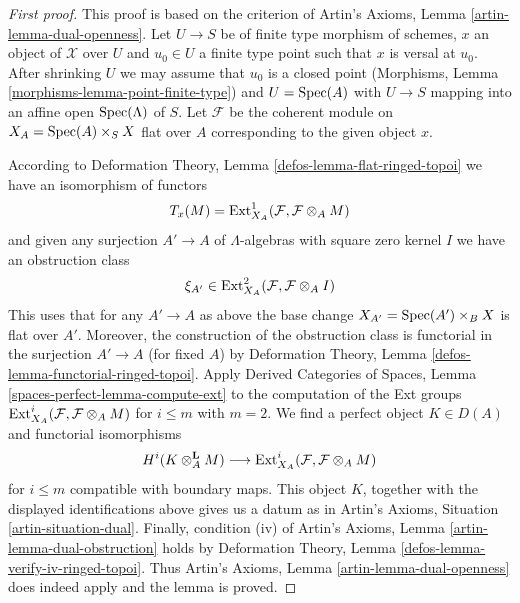 \begin{proof}[First proof]
This proof is based on the criterion of
Artin's Axioms, Lemma \ref{artin-lemma-dual-openness}.
Let $U \to S$ be of finite type morphism of schemes, $x$ an object of
$\mathcal{X}$ over $U$ and $u_0 \in U$ a finite type point such that
$x$ is versal at $u_0$. After shrinking $U$ we may assume that $u_0$
is a closed point (Morphisms, Lemma \ref{morphisms-lemma-point-finite-type})
and $U = \mathop{\mathrm{Spec}}(A)$ with $U \to S$ mapping into an
affine open $\mathop{\mathrm{Spec}}(\Lambda)$ of $S$.
Let $\mathcal{F}$ be the coherent module on $X_A = \mathop{\mathrm{Spec}}(A) \times_S X$
flat over $A$ corresponding to the given object $x$.

\medskip\noindent
According to Deformation Theory, Lemma \ref{defos-lemma-flat-ringed-topoi}
we have an isomorphism of functors
$$
T_x(M) = \mathop{\mathrm{Ext}}\nolimits^1_{X_A}(\mathcal{F}, \mathcal{F} \otimes_A M)
$$
and given any surjection $A' \to A$ of $\Lambda$-algebras with square zero
kernel $I$ we have an obstruction class
$$
\xi_{A'} \in \mathop{\mathrm{Ext}}\nolimits^2_{X_A}(\mathcal{F}, \mathcal{F} \otimes_A I)
$$
This uses that for any $A' \to A$ as above the base change
$X_{A'} = \mathop{\mathrm{Spec}}(A') \times_B X$ is flat over $A'$.
Moreover, the construction of the obstruction class is functorial
in the surjection $A' \to A$ (for fixed $A$) by
Deformation Theory, Lemma \ref{defos-lemma-functorial-ringed-topoi}.
Apply Derived Categories of Spaces, Lemma
\ref{spaces-perfect-lemma-compute-ext}
to the computation of the Ext groups
$\mathop{\mathrm{Ext}}\nolimits^i_{X_A}(\mathcal{F}, \mathcal{F} \otimes_A M)$
for $i \leq m$ with $m = 2$. We find a perfect object $K \in D(A)$
and functorial isomorphisms
$$
H^i(K \otimes_A^\mathbf{L} M)
\longrightarrow
\mathop{\mathrm{Ext}}\nolimits^i_{X_A}(\mathcal{F}, \mathcal{F} \otimes_A M)
$$
for $i \leq m$ compatible with boundary maps. This object $K$, together
with the displayed identifications above gives us a datum as in
Artin's Axioms, Situation \ref{artin-situation-dual}.
Finally, condition (iv) of
Artin's Axioms, Lemma \ref{artin-lemma-dual-obstruction}
holds by 
Deformation Theory, Lemma \ref{defos-lemma-verify-iv-ringed-topoi}.
Thus Artin's Axioms, Lemma \ref{artin-lemma-dual-openness}
does indeed apply and the lemma is proved.
\end{proof}

